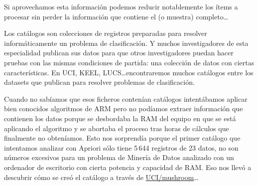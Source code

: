 Si aprovechamos esta información podemos reducir notablemente los ítems a procesar sin perder la información que contiene el \catalogo (o muestra) completo\ldots








%
%
%
%
%
%
%
%
%
%
%
%










Los catálogos son colecciones de registros preparadas para resolver informáticamente un problema de clasificación. Y muchos investigadores de esta especialidad publican sus datos para que otros investigadores puedan hacer pruebas con las mismas condiciones de partida: una colección de datos con ciertas características. En UCI, KEEL, LUCS\ldots encontraremos muchos catálogos entre los datasets que publican para resolver problemas de clasificación.

Cuando no sabíamos que esos ficheros contenían catálogos intentábamos aplicar bien conocidos algoritmos de ARM pero no podíamos extraer información que contienen los datos porque se desbordaba la RAM del equipo en que se está aplicando el algoritmo y se abortaba el proceso tras horas de cálculos que finalmente no obteníamos. Esto nos sorprendía porque el primer catálogo que intentamos analizar con Apriori sólo tiene 5\,644 registros de 23 datos, no son números excesivos para un problema de Minería de Datos analizado con un ordenador de escritorio con cierta potencia y capacidad de RAM. Eso nos llevó a descubrir cómo se creó el catálogo a través de \url{UCI/mushroom}\ldots

